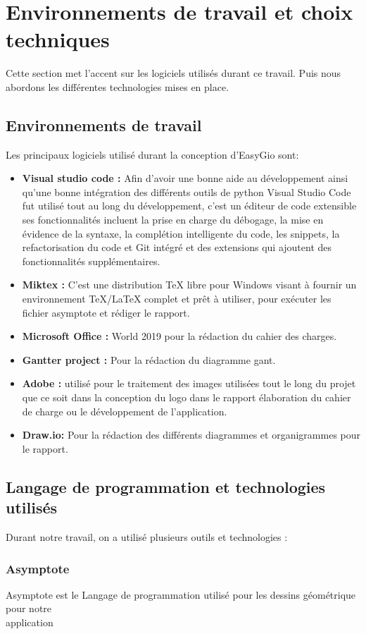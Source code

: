 \documentclass[a4paper]{report}
\begin{document}
\section{Environnements de travail et choix techniques}
Cette section met l’accent sur les logiciels utilisés durant ce travail. Puis nous abordons les différentes technologies mises en place.
\subsection{Environnements de travail}
Les principaux logiciels utilisé durant la conception d'EasyGio sont:
\begin{itemize}
    \item \textbf{Visual studio code :} Afin d’avoir une bonne aide au développement ainsi qu’une bonne intégration des différents outils de python Visual Studio Code fut utilisé tout au long du développement, c'est un éditeur de code extensible ses fonctionnalités incluent la prise en charge du débogage, la mise en évidence de la syntaxe, la complétion intelligente du code, les snippets, la refactorisation du code et Git intégré et des extensions qui ajoutent des  fonctionnalités supplémentaires.
    \item  \textbf{Miktex :} C'est une distribution TeX libre pour Windows visant à fournir un environnement TeX/LaTeX complet et prêt à utiliser, pour exécuter les fichier asymptote et rédiger le rapport.
    \item  \textbf{Microsoft Office :} World 2019 pour la rédaction du cahier des charges.
    \item  \textbf{Gantter project :} Pour la rédaction du diagramme gant.
    \item  \textbf{Adobe :} utilisé pour le traitement des images utilisées tout le long du projet que ce soit dans la conception du logo dans le rapport élaboration du cahier de charge ou le développement de l’application.
    \item  \textbf{Draw.io:} Pour la rédaction des différents diagrammes et organigrammes pour le rapport.
\end{itemize}
\subsection{Langage de programmation et technologies utilisés}
Durant notre travail, on a utilisé plusieurs outils et technologies :
\subsubsection{Asymptote}
Asymptote est le Langage de programmation utilisé pour les dessins géométrique pour notre \\application 
\end{document}
